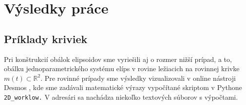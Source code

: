 \chapter{Výsledky práce}

\section{Príklady kriviek}
Pri konštrukcií obálok elipsoidov sme vyriešili aj o rozmer nižší prípad, a to, obálku jednoparametrického systému elíps v rovine ležiacich na rovinnej krivke $m(t) \subset \mathbb{R}^2$. Pre rovinné prípady sme výsledky vizualizovali v online nástroji Desmos \cite{Desmos}, kde sme zadávali matematické výrazy vypočítané skriptom v Pythone \verb|2D_worklow.| V adresári sa nachádza niekoľko textových súborov s výpočtami.

